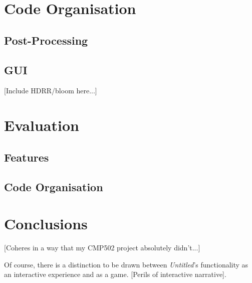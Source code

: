 \documentclass[a4paper, 11pt]{article}
\begin{document}
\begin{flushleft}
\vspace{5pt}
 
\section{Code Organisation}


\subsection{Post-Processing}

\subsection{GUI}

[Include HDRR/bloom here...]

\section{Evaluation}\label{Evaluation}

\subsection{Features}

\subsection{Code Organisation}

\section{Conclusions}

[Coheres in a way that my CMP502 project absolutely didn't...]

\vspace{5pt}\noindent
Of course, there is a distinction to be drawn between \textit{Untitled}'s functionality as an interactive experience and as a game. [Perils of interactive narrative].

\vspace{5pt}



\end{flushleft}
\end{document}
